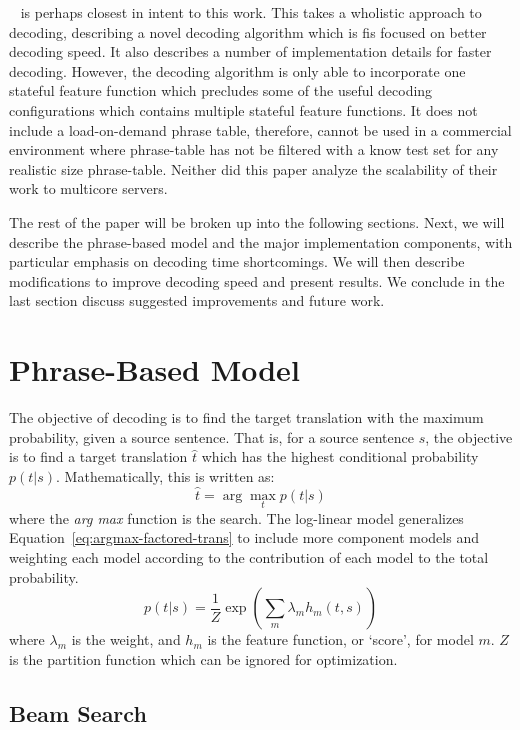 \documentclass[11pt]{article}
\begin{document}
~ is perhaps closest in intent to this work. This takes a wholistic approach to decoding, describing a novel decoding algorithm which is fis focused on better decoding speed. It also describes a number of implementation details for faster decoding. However, the decoding algorithm is only able to incorporate one stateful feature function which precludes some of the useful decoding configurations which contains multiple stateful feature functions. It does not include a load-on-demand phrase table, therefore, cannot be used in a commercial environment where phrase-table has not be filtered with a know test set for any realistic size phrase-table. Neither did this paper analyze the scalability of their work to multicore servers.

The rest of the paper will be broken up into the following sections. Next, we will describe the phrase-based model and the major implementation components, with particular emphasis on decoding time shortcomings. We will then describe modifications to improve decoding speed and present results. We conclude in the last section discuss suggested improvements and future work.

\section{Phrase-Based Model}

The objective of decoding is to find the target translation with the maximum probability, given a source sentence. That is, for a source sentence $s$, the objective is to find a target translation $\hat{t}$ which has the highest conditional probability $p(t | s)$. Mathematically, this is written as:
\begin{equation}
\hat{t} = \arg \max_t p( t | s )
\label{eq:argmax-factored-trans}
\end{equation}
where the \emph{arg max} function is the search. The log-linear model generalizes Equation~\ref{eq:argmax-factored-trans} to include more component models and weighting each model according to the contribution of each model to the total probability. 
\begin{equation}
\label{eq:Log-Linear}
p(t | s) 	=  \frac{1}{Z} \exp ( \sum_m \lambda_m h_m ( t, s)^{} )
\end{equation}
where $\lambda_m$ is the weight, and $h_m$ is the feature function, or `score', for model $m$. $Z$ is the partition function which can be ignored for optimization. 

\subsection{Beam Search}
\end{document}

